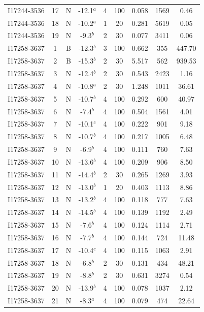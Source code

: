 \begin{table}
\begin{tabular}{ccccccccc}
I17244-3536 & 17 & N & -12.1$^{a}$ & 4 & 100 & 0.058 & 1569 & 0.46 \\
I17244-3536 & 18 & N & -10.2$^{a}$ & 1 & 20 & 0.281 & 5619 & 0.05 \\
I17244-3536 & 19 & N & -9.3$^{b}$ & 2 & 30 & 0.077 & 3411 & 0.06 \\
I17258-3637 & 1 & B & -12.3$^{b}$ & 3 & 100 & 0.662 & 355 & 447.70 \\
I17258-3637 & 2 & B & -15.3$^{b}$ & 2 & 30 & 5.517 & 562 & 939.53 \\
I17258-3637 & 3 & N & -12.4$^{b}$ & 2 & 30 & 0.543 & 2423 & 1.16 \\
I17258-3637 & 4 & N & -10.8$^{a}$ & 2 & 30 & 1.248 & 1011 & 36.61 \\
I17258-3637 & 5 & N & -10.7$^{b}$ & 4 & 100 & 0.292 & 600 & 40.97 \\
I17258-3637 & 6 & N & -7.4$^{b}$ & 4 & 100 & 0.504 & 1561 & 4.01 \\
I17258-3637 & 7 & N & -10.1$^{c}$ & 4 & 100 & 0.222 & 901 & 9.18 \\
I17258-3637 & 8 & N & -10.7$^{b}$ & 4 & 100 & 0.217 & 1005 & 6.48 \\
I17258-3637 & 9 & N & -6.9$^{b}$ & 4 & 100 & 0.111 & 760 & 7.63 \\
I17258-3637 & 10 & N & -13.6$^{b}$ & 4 & 100 & 0.209 & 906 & 8.50 \\
I17258-3637 & 11 & N & -14.4$^{b}$ & 2 & 30 & 0.265 & 1269 & 3.93 \\
I17258-3637 & 12 & N & -13.0$^{b}$ & 1 & 20 & 0.403 & 1113 & 8.86 \\
I17258-3637 & 13 & N & -13.2$^{b}$ & 4 & 100 & 0.118 & 777 & 7.63 \\
I17258-3637 & 14 & N & -14.5$^{b}$ & 4 & 100 & 0.139 & 1192 & 2.49 \\
I17258-3637 & 15 & N & -7.6$^{b}$ & 4 & 100 & 0.124 & 1114 & 2.71 \\
I17258-3637 & 16 & N & -7.7$^{b}$ & 4 & 100 & 0.144 & 724 & 11.48 \\
I17258-3637 & 17 & N & -10.4$^{c}$ & 4 & 100 & 0.115 & 1063 & 2.91 \\
I17258-3637 & 18 & N & -6.8$^{b}$ & 2 & 30 & 0.131 & 434 & 48.21 \\
I17258-3637 & 19 & N & -8.8$^{b}$ & 2 & 30 & 0.631 & 3274 & 0.54 \\
I17258-3637 & 20 & N & -13.9$^{b}$ & 4 & 100 & 0.078 & 1037 & 2.12 \\
I17258-3637 & 21 & N & -8.3$^{a}$ & 4 & 100 & 0.079 & 474 & 22.64 \\

\end{tabular}
\end{table}
